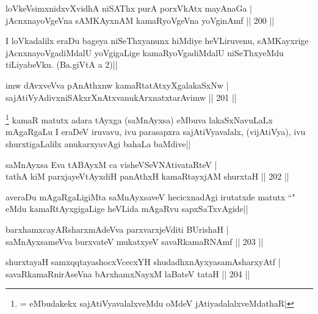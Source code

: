 \begin{shl}
loVkeV\s simxnidxvXvidhA niSAThx purA porxVkAtx mayA\s naGa |\\
jAcnxnayoVgeVna sAMKAyxnAM kamaRyoVgeVna yoVginAmf \hfill || 200 ||
\end{shl}

\begin{artha}
I loVkadalilx eraDu bageya niSeThxyanunx hiMdiye heVLiruvenu, sAMKayxrige jAcnxnayoVgadiMdalU yoVgigaLige kamaRyoVgadiMdalU niSeThxyeMdu tiLiyabeVku. (Ba.giVtA a 2)||
\end{artha}


\begin{shl}
imw dAvxveVva pAnAthxnw kamaRtatAtxyXgalakaSxNw |\\
sajAtiVyAdivxniSAkxrXnAtxvanukArxnatxtarAvimw \hfill || 201 ||
\end{shl}

\begin{artha}
\footnote[1]{\stext = eMbudakekx sajAtiVyavalalxveMdu oMdeV jAtiyadalalxveMdathaR|} kamaR matutx adara tAyxga (saMnAyxsa) eMbuva lakaSxNavuLaLx mAgaRgaLu I eraDeV iruvavu, ivu parasapxra sajAtiVyavalalx, (vijAtiVya), ivu shurxtigaLalilx anukarxyavAgi bahaLa baMdive||
\end{artha}

\begin{shl}
saMnAyxsa Eva tABAyxM ca visheVSeVNAtivataRteV |\\
tathA kiM parxjayeVtAyxdiH panAthxH kamaRtayxjAM shurxtaH \hfill || 202 ||
\end{shl}

\begin{artha}
averaDu mAgaRgaLigiMta saMnAyxsaveV hecicxnadAgi irutatxde matutx ``\stext " eMdu kamaRtAyxgigaLige heVLida mAgaRvu sapxSaTxvAgide||
\end{artha}

\begin{shl}
barxhamxcayARsharxmAdeVva parxvarxjeVditi BUrishaH |\\
saMnAyxsameVva burxvateV mukatxyeV savaRkamaRNAmf \hfill || 203 ||
\end{shl}

\begin{shl}
shurxtayaH samxqqtayashocxVcecxYH shudadhxnAyxyasamAsharxyAtf |\\
savaRkamaRnirAseVna bArxhamxNayxM laBateV tataH \hfill || 204 ||
\end{shl}

